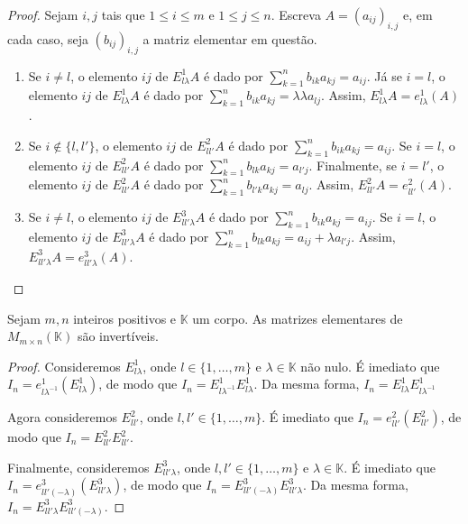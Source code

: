 \begin{definition}
        \begin{proof}
            Sejam $i, j$ tais que $1\leq i \leq m$ e $1\leq j \leq n$.
            Escreva $A=(a_{ij})_{i, j}$ e, em cada caso, seja $(b_{ij})_{i, j}$ a matriz elementar em questão.
            \begin{enumerate}
                \item Se $i\neq l$, o elemento $ij$ de $E_{l\lambda}^1 A$ é dado por $\sum_{k=1}^n b_{ik}a_{kj}=a_{ij}$.
                Já se $i=l$, o elemento $ij$ de $E_{l\lambda}^1 A$ é dado por $\sum_{k=1}^n b_{ik}a_{kj}=\lambda \lambda a_{lj}$.
                Assim, $E_{l\lambda}^1 A = e_{l\lambda}^1(A)$.
                \item Se $i\notin\{l, l'\}$, o elemento $ij$ de $E_{l l'}^2 A$ é dado por $\sum_{k=1}^n b_{ik}a_{kj}=a_{ij}$.
                Se $i=l$, o elemento $ij$ de $E_{l l'}^2 A$ é dado por $\sum_{k=1}^n b_{lk}a_{kj}=a_{l'j}$.
                Finalmente, se $i=l'$, o elemento $ij$ de $E_{l l'}^2 A$ é dado por $\sum_{k=1}^n b_{l'k}a_{kj}=a_{lj}$.
                Assim, $E_{l l'}^2 A = e_{l l'}^2(A)$.
                \item Se $i\neq l$, o elemento $ij$ de $E_{l l'\lambda}^3 A$ é dado por $\sum_{k=1}^n b_{ik}a_{kj}=a_{ij}$.
                Se $i=l$, o elemento $ij$ de $E_{l l'\lambda}^3 A$ é dado por $\sum_{k=1}^n b_{lk}a_{kj}=a_{ij}+\lambda a_{l'j}$.
                Assim, $E_{l l'\lambda}^3 A = e_{l l'\lambda}^3(A)$.
            \end{enumerate}
        \end{proof}
\end{definition}

\begin{lemma}
    Sejam $m, n$ inteiros positivos e $\mathbb K$ um corpo. As matrizes elementares de $M_{m \times n}(\mathbb K)$ são invertíveis.
\end{lemma}
\begin{proof}
    Consideremos $E_{l\lambda}^1$, onde $l\in \{1, \ldots, m\}$ e $\lambda \in \mathbb K$ não nulo. É imediato que $I_n=e_{l\lambda^{-1}}^1(E_{l\lambda}^1)$, de modo que $I_n=E_{l\lambda^{-1}}^1 E_{l\lambda}^1$.
    Da mesma forma, $I_n=E_{l\lambda}^1 E_{l\lambda^{-1}}^1$

    Agora consideremos $E_{l l'}^2$, onde $l, l'\in \{1, \ldots, m\}$. É imediato que $I_n=e_{l l'}^2(E_{l l'}^2)$, de modo que $I_n=E_{l l'}^2 E_{l l'}^2$.

    Finalmente, consideremos $E_{l l'\lambda}^3$, onde $l, l'\in \{1, \ldots, m\}$ e $\lambda \in \mathbb K$. É imediato que $I_n=e_{l l'(-\lambda)}^3(E_{l l'\lambda}^3)$, de modo que $I_n=E_{l l'(-\lambda)}^3 E_{l l'\lambda}^3$.
    Da mesma forma, $I_n=E_{l l'\lambda}^3 E_{l l'(-\lambda)}^3$.
\end{proof}

